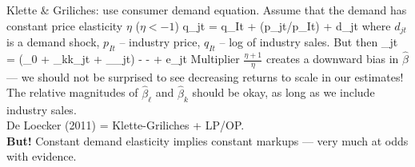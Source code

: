 \begin{frame}
	Klette \& Griliches: use consumer demand equation. Assume that the demand has constant price elasticity $\eta$ ($\eta<-1$)\:
	\be
		q_{jt} = q_{It} + \eta\ln(p_{jt}/p_{It}) + d_{jt}
	\ee
	where $d_{jt}$ is a demand shock, $p_{It}$ -- industry price, $q_{It}$ -- log of industry sales. But then
	\be
		_{jt} = (\beta_0 + \beta_kk_{jt} + \beta_\ell\ell_{jt}) -  -  + e_{jt}
	\ee
	Multiplier $\frac{\eta+1}{\eta}$ creates a downward bias in $\widehat\beta$ --- we should not be surprised to see decreasing returns to scale in our estimates!\\\medskip
	The relative magnitudes of $\widehat\beta_\ell$ and $\widehat\beta_k$ should be okay, as long as we include industry sales.\\\bigskip
	De Loecker (2011) = Klette-Griliches + LP/OP.\\\medskip
	\textbf{But!} Constant demand elasticity implies constant markups --- very much at odds with evidence.
\end{frame}